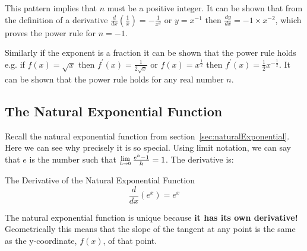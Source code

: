 This pattern implies that $n$ must be a positive integer. It can be shown that from the definition of a derivative $\frac{d}{d x} \genfrac{(}{)}{}{}{1}{x} = -\frac{1}{x^{2}}$ or $y =x^{ -1}$ then $\frac{d y}{d x} = -1 \times x^{ -2}$, which proves the power rule for $n = -1$.

Similarly if the exponent is a fraction it can be shown that the power rule holds e.g. if $f (x) =\sqrt{x}$ then $f^{ \prime } (x) =\frac{1}{2 \sqrt{x}}$ or $f (x) =x^{\frac{1}{2}}$ then $f^{ \prime } (x) =\frac{1}{2} x^{ -\frac{1}{2}}$. It can be shown that the power rule holds for any real number $n$.

\subsection*{The Natural Exponential Function}
Recall the natural exponential function from section~\ref{sec:naturalExponential}. Here we can see why precisely it is so special. Using limit notation, we can say that $e$ is the number such that $\Lim{h\to 0}\frac{e^{h} -1}{h} =1$. The derivative is:

\begin{tcolorbox}
The Derivative of the Natural Exponential Function
$$\frac{d}{d x} \left (e^{x}\right ) =e^{x}$$
\end{tcolorbox}

The natural exponential function is unique because \textbf{it has its own derivative!} Geometrically this means that the slope of the tangent at any point is the same as the y-coordinate, $f(x)$, of that point.

